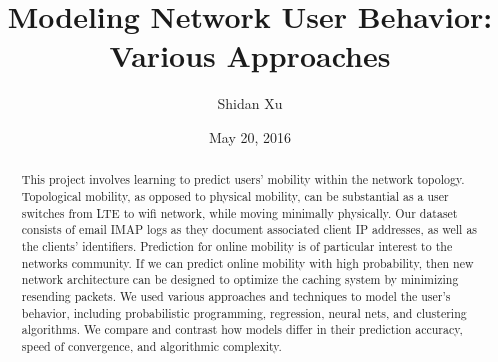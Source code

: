 \documentclass[]{article}
\title{Modeling Network User Behavior: Various Approaches}
\date{May 20, 2016}
\author{Shidan Xu}
\begin{document}
\maketitle

%



\begin{abstract}

This project involves learning to predict users' mobility within the network topology. Topological mobility, as opposed to physical mobility, can be substantial as a user switches from LTE to wifi network, while moving minimally physically. Our dataset consists of email IMAP logs as they document associated client IP addresses, as well as the clients' identifiers. Prediction for online mobility is of particular interest to the networks community. If we can predict online mobility with high probability, then new network architecture can be designed to optimize the caching system by minimizing resending packets.  We used various approaches and techniques to model the user's behavior, including probabilistic programming, regression, neural nets, and clustering algorithms. We compare and contrast how models differ in their prediction accuracy, speed of convergence, and algorithmic complexity. 


\end{abstract}
\end{document}
